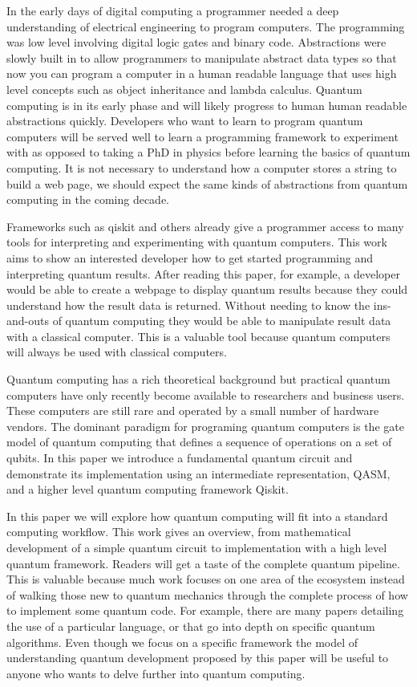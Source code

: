\documentclass{article}
\begin{document}
In the early days of digital computing a programmer needed a deep understanding of electrical engineering to program computers. The programming was low level involving digital logic gates and binary code. Abstractions were slowly built in to allow programmers to manipulate abstract data types so that now you can program a computer in a human readable language that uses high level concepts such as object inheritance and lambda calculus. Quantum computing is in its early phase and will likely progress to human human readable abstractions quickly. Developers who want to learn to program quantum computers will be served well to learn a programming framework to experiment with as opposed to taking a PhD in physics before learning the basics of quantum computing. It is not necessary to understand how a computer stores a string to build a web page, we should expect the same kinds of abstractions from quantum computing in the coming decade.

Frameworks such as qiskit and others already give a programmer access to many tools for interpreting and experimenting with quantum computers. This work aims to show an interested developer how to get started programming and interpreting quantum results. After reading this paper, for example, a developer would be able to create a webpage to display quantum results because they could understand how the result data is returned. Without needing to know the ins-and-outs of quantum computing they would be able to manipulate result data with a classical computer. This is a valuable tool because quantum computers will always be used with classical computers.

Quantum computing has a rich theoretical background but practical quantum computers have only recently become available to researchers and business users. These computers are still rare and operated by a small number of hardware vendors. The dominant paradigm for programing quantum computers is the gate model of quantum computing that defines a sequence of operations on a set of qubits. In this paper we introduce a fundamental quantum circuit and demonstrate its implementation using an intermediate representation, QASM, and a higher level quantum computing framework Qiskit. 

In this paper we will explore how quantum computing will fit into a standard computing workflow. This work gives an overview, from mathematical development of a simple quantum circuit to implementation with a high level quantum framework. Readers will get a taste of the complete quantum pipeline. This is valuable because much work focuses on one area of the ecosystem instead of walking those new to quantum mechanics through the complete process of how to implement some quantum code. For example, there are many papers detailing the use of a particular language, or that go into depth on specific quantum algorithms. Even though we focus on a specific framework the model of understanding quantum development proposed by this paper will be useful to anyone who wants to delve further into quantum computing. 
\end{document}
